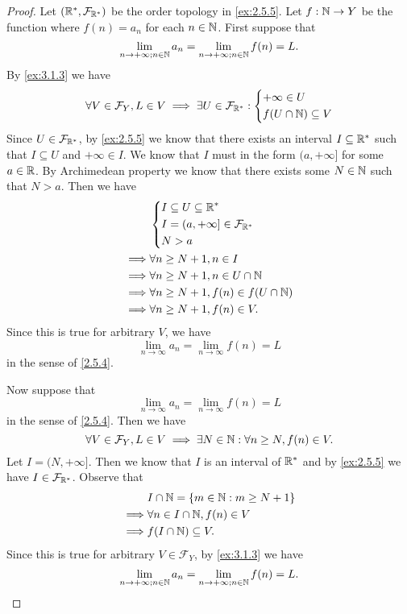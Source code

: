 \begin{proof}
  Let \((\mathbb{R}^*, \mathcal{F}_{\mathbb{R}^*})\) be the order topology in \cref{ex:2.5.5}.
  Let \(f : \mathbb{N} \to Y\) be the function where \(f(n) = a_n\) for each \(n \in \mathbb{N}\).
  First suppose that
  \[
    \lim_{n \to +\infty ; n \in \mathbb{N}} a_n = \lim_{n \to +\infty ; n \in \mathbb{N}} f(n) = L.
  \]
  By \cref{ex:3.1.3} we have
  \[
    \forall V \in \mathcal{F}_Y, L \in V \implies \exists U \in \mathcal{F}_{\mathbb{R}^*} : \begin{dcases}
      +\infty \in U \\
      f(U \cap \mathbb{N}) \subseteq V
    \end{dcases}
  \]
  Since \(U \in \mathcal{F}_{\mathbb{R}^*}\), by \cref{ex:2.5.5} we know that there exists an interval \(I \subseteq \mathbb{R}^*\) such that \(I \subseteq U\) and \(+\infty \in I\).
  We know that \(I\) must in the form \((a, +\infty]\) for some \(a \in \mathbb{R}\).
  By Archimedean property we know that there exists some \(N \in \mathbb{N}\) such that \(N > a\).
  Then we have
  \begin{align*}
             & \begin{dcases}
                 I \subseteq U \subseteq \mathbb{R}^*            \\
                 I = (a, +\infty] \in \mathcal{F}_{\mathbb{R}^*} \\
                 N > a
               \end{dcases}     \\
    \implies & \forall n \geq N + 1, n \in I               \\
    \implies & \forall n \geq N + 1, n \in U \cap \mathbb{N}       \\
    \implies & \forall n \geq N + 1, f(n) \in f(U \cap \mathbb{N}) \\
    \implies & \forall n \geq N + 1, f(n) \in V.
  \end{align*}
  Since this is true for arbitrary \(V\), we have
  \[
    \lim_{n \to \infty} a_n = \lim_{n \to \infty} f(n) = L
  \]
  in the sense of \cref{2.5.4}.

  Now suppose that
  \[
    \lim_{n \to \infty} a_n = \lim_{n \to \infty} f(n) = L
  \]
  in the sense of \cref{2.5.4}.
  Then we have
  \[
    \forall V \in \mathcal{F}_Y, L \in V \implies \exists N \in \mathbb{N} : \forall n \geq N, f(n) \in V.
  \]
  Let \(I = (N, +\infty]\).
  Then we know that \(I\) is an interval of \(\mathbb{R}^*\) and by \cref{ex:2.5.5} we have \(I \in \mathcal{F}_{\mathbb{R}^*}\).
  Observe that
  \begin{align*}
             & I \cap \mathbb{N} = \left\lbrace m \in \mathbb{N} : m \geq N + 1\right\rbrace \\
    \implies & \forall n \in I \cap \mathbb{N}, f(n) \in V       \\
    \implies & f(I \cap \mathbb{N}) \subseteq V.
  \end{align*}
  Since this is true for arbitrary \(V \in \mathcal{F}_Y\), by \cref{ex:3.1.3} we have
  \[
    \lim_{n \to +\infty ; n \in \mathbb{N}} a_n = \lim_{n \to +\infty ; n \in \mathbb{N}} f(n) = L.
  \]
\end{proof}

